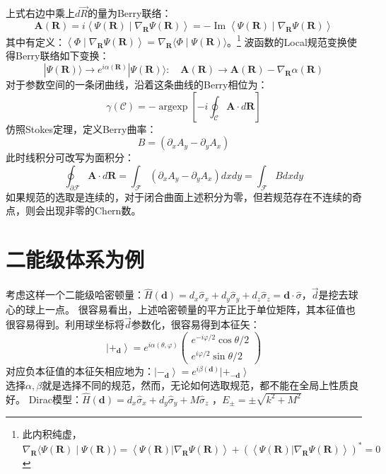 \documentclass[12pt, a4paper, oneside]{ctexbook}
\begin{document}
	上式右边中乘上$ d\vec{R} $的量为Berry联络：
	\begin{equation}
		\mathbf{A}(\mathbf{R})=i\left\langle\Psi(\mathbf{R}) \mid \nabla_{\mathbf{R}} \Psi(\mathbf{R})\right\rangle=-\operatorname{Im}\left\langle\Psi(\mathbf{R}) \mid \nabla_{\mathbf{R}} \Psi(\mathbf{R})\right\rangle
	\end{equation} 
	其中有定义：$ \left\langle\Phi \mid \nabla_{\mathbf{R}} \Psi(\mathbf{R})\right\rangle=\nabla_{\mathbf{R}}\langle\Phi \mid \Psi(\mathbf{R})\rangle $。\footnote{此内积纯虚，$ \nabla_{\mathbf{R}}\langle\Psi(\mathbf{R}) \mid \Psi(\mathbf{R})\rangle=\left\langle\Psi(\mathbf{R})|\nabla_{\mathbf{R}} \Psi(\mathbf{R})\right\rangle+(\left\langle\Psi(\mathbf{R})|\nabla_{\mathbf{R}} \Psi(\mathbf{R})\right\rangle)^*=0 $ }
	波函数的Local规范变换使得Berry联络如下变换：
	\begin{equation}
		|\Psi(\mathbf{R})\rangle \rightarrow e^{i \alpha(\mathbf{R})}|\Psi(\mathbf{R})\rangle: \quad \mathbf{A}(\mathbf{R}) \rightarrow \mathbf{A}(\mathbf{R})-\nabla_{\mathbf{R}} \alpha(\mathbf{R})
	\end{equation} 
	对于参数空间的一条闭曲线，沿着这条曲线的Berry相位为：
	\begin{equation}
		\gamma(\mathscr{C})=-\operatorname{argexp}\left[-i \oint_{\mathscr{C}} \mathbf{A} \cdot d \mathbf{R}\right]
	\end{equation}
	仿照Stokes定理，定义Berry曲率：
	\begin{equation}
		B=\left(\partial_x A_y-\partial_y A_x\right)
	\end{equation}
	此时线积分可改写为面积分：
	\begin{equation}
		\oint_{\partial \mathscr{F}} \mathbf{A} \cdot d \mathbf{R}=\int_{\mathscr{F}}\left(\partial_x A_y-\partial_y A_x\right) d x d y=\int_{\mathscr{F}} B d x d y
	\end{equation}
	如果规范的选取是连续的，对于闭合曲面上述积分为零，但若规范存在不连续的奇点，则会出现非零的Chern数。
	\section{二能级体系为例}
	考虑这样一个二能级哈密顿量：$ \hat{H}(\mathbf{d})=d_x \hat{\sigma}_x+d_y \hat{\sigma}_y+d_z \hat{\sigma}_z=\mathbf{d} \cdot \hat{\sigma} $，$ \vec{d} $是挖去球心的球上一点。
	很容易看出，上述哈密顿量的平方正比于单位矩阵，其本征值也很容易得到。利用球坐标将$ \vec{d} $参数化，很容易得到本征矢：
	\begin{equation}
		\left|+_{\mathbf{d}}\right\rangle=e^{i \alpha(\theta, \varphi)}\left(\begin{array}{c}
			e^{-i \varphi / 2} \cos \theta / 2 \\
			e^{i \varphi / 2} \sin \theta / 2
			\end{array}\right)
	\end{equation}   
	对应负本征值的本征矢相应地为：$ \left|-_{\mathbf{d}}\right\rangle=e^{i \beta(\mathbf{d})}\left|+_{-\mathbf{d}}\right\rangle $\\
	选择$ \alpha,\beta $就是选择不同的规范，然而，无论如何选取规范，都不能在全局上性质良好。  
	Dirac模型：$ \hat{H}(\mathbf{d})=d_x \hat{\sigma}_x+d_y \hat{\sigma}_y+M \hat{\sigma}_z $
	，$ E_\pm=\pm\sqrt{k^2+M^2} $  
\end{document}
